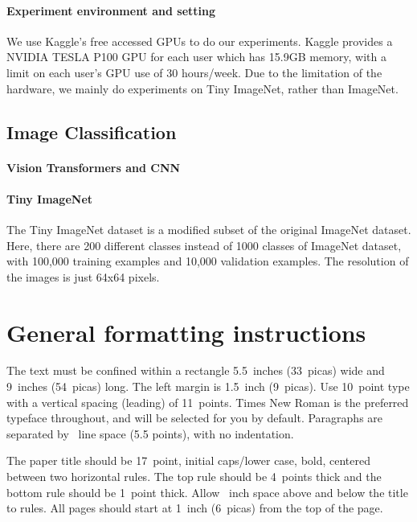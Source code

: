 \documentclass{article}
\begin{document}
\paragraph{Experiment environment and setting}
We use Kaggle's free accessed GPUs to do our experiments. 
Kaggle provides a NVIDIA TESLA P100 GPU for each user which has 15.9GB memory, with a limit on each user's GPU use of 30 hours/week.
Due to the limitation of the hardware, we mainly do experiments on Tiny ImageNet, rather than ImageNet.

\subsection{Image Classification}

\paragraph{Vision Transformers and CNN}
\cite{dosovitskiy2020image}

\paragraph{Tiny ImageNet}
The Tiny ImageNet dataset is a modified subset of the original ImageNet dataset.
Here, there are 200 different classes instead of 1000 classes of ImageNet dataset,
with 100,000 training examples and 10,000 validation examples.
The resolution of the images is just 64x64 pixels.

\section{General formatting instructions}
\label{gen_inst}


The text must be confined within a rectangle 5.5~inches (33~picas) wide and
9~inches (54~picas) long. The left margin is 1.5~inch (9~picas).  Use 10~point
type with a vertical spacing (leading) of 11~points.  Times New Roman is the
preferred typeface throughout, and will be selected for you by default.
Paragraphs are separated by ~line space (5.5 points), with no
indentation.


The paper title should be 17~point, initial caps/lower case, bold, centered
between two horizontal rules. The top rule should be 4~points thick and the
bottom rule should be 1~point thick. Allow ~inch space above and
below the title to rules. All pages should start at 1~inch (6~picas) from the
top of the page.
\end{document}
